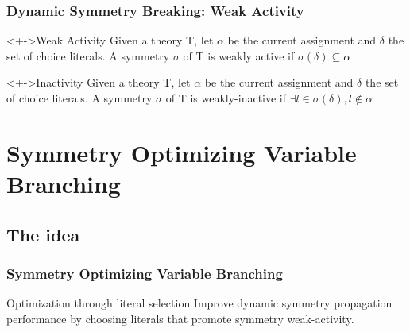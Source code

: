 \documentclass{beamer}
\begin{document}
	\begin{frame}
		\frametitle{Dynamic Symmetry Breaking: Weak Activity}

		\begin{block}<+->{Weak Activity}
			Given a theory T, let $\alpha$ be the current assignment and $\delta$ the set of
			choice literals.
			A symmetry $\sigma$ of T is weakly active if $\sigma(\delta) \subseteq \alpha$
		\end{block}

		\begin{block}<+->{Inactivity}
			Given a theory T, let $\alpha$ be the current assignment and $\delta$ the set of
			choice literals.
			A symmetry $\sigma$ of T is weakly-inactive if $\exists l \in \sigma(\delta), l \not\in \alpha$
		\end{block}
	\end{frame}

\section{Symmetry Optimizing Variable Branching}

	\subsection{The idea}
	\begin{frame}
		\frametitle{Symmetry Optimizing Variable Branching}

		\begin{block}{Optimization through literal selection}
			Improve dynamic symmetry propagation performance by choosing literals that promote
			symmetry weak-activity.
		\end{block}
	\end{frame}
\end{document}
